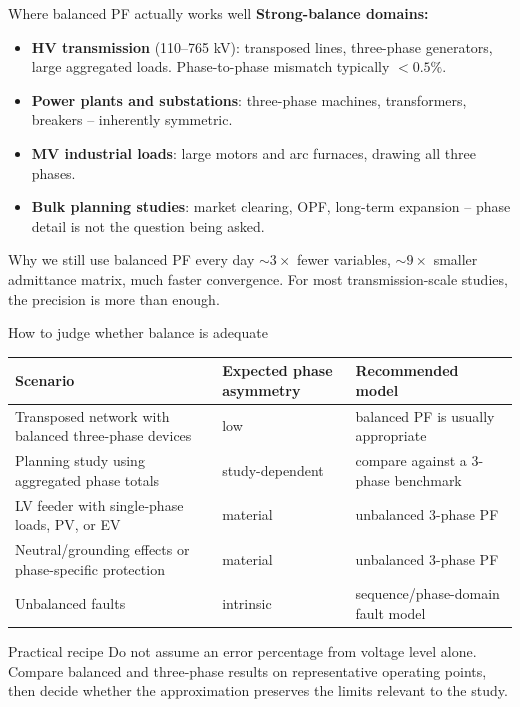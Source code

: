 \documentclass[aspectratio=169,10pt]{beamer}
\begin{document}
\begin{frame}{Where balanced PF actually works well}
\textbf{Strong-balance domains:}
\begin{itemize}
  \item \textbf{HV transmission} (110--765 kV): transposed lines, three-phase generators, large aggregated loads. Phase-to-phase mismatch typically $< 0.5\%$.
  \item \textbf{Power plants and substations}: three-phase machines, transformers, breakers -- inherently symmetric.
  \item \textbf{MV industrial loads}: large motors and arc furnaces, drawing all three phases.
  \item \textbf{Bulk planning studies}: market clearing, OPF, long-term expansion -- phase detail is not the question being asked.
\end{itemize}
\vspace{0.4em}
\begin{block}{Why we still use balanced PF every day}
$\sim 3\times$ fewer variables, $\sim 9\times$ smaller admittance matrix, much faster convergence. For most transmission-scale studies, the precision is more than enough.
\end{block}
\end{frame}

\begin{frame}{How to judge whether balance is adequate}
\centering
\small
\begin{tabular}{p{}p{}p{}}
\toprule
Scenario & Expected phase asymmetry & Recommended model \\
\midrule
Transposed network with balanced three-phase devices & low & balanced PF is usually appropriate \\
Planning study using aggregated phase totals & study-dependent & compare against a 3-phase benchmark \\
LV feeder with single-phase loads, PV, or EV & material & unbalanced 3-phase PF \\
Neutral/grounding effects or phase-specific protection & material & unbalanced 3-phase PF \\
Unbalanced faults & intrinsic & sequence/phase-domain fault model \\
\bottomrule
\end{tabular}
\vspace{0.6em}
\begin{block}{Practical recipe}
Do not assume an error percentage from voltage level alone. Compare balanced and three-phase results on representative operating points, then decide whether the approximation preserves the limits relevant to the study.
\end{block}
\end{frame}
\end{document}
